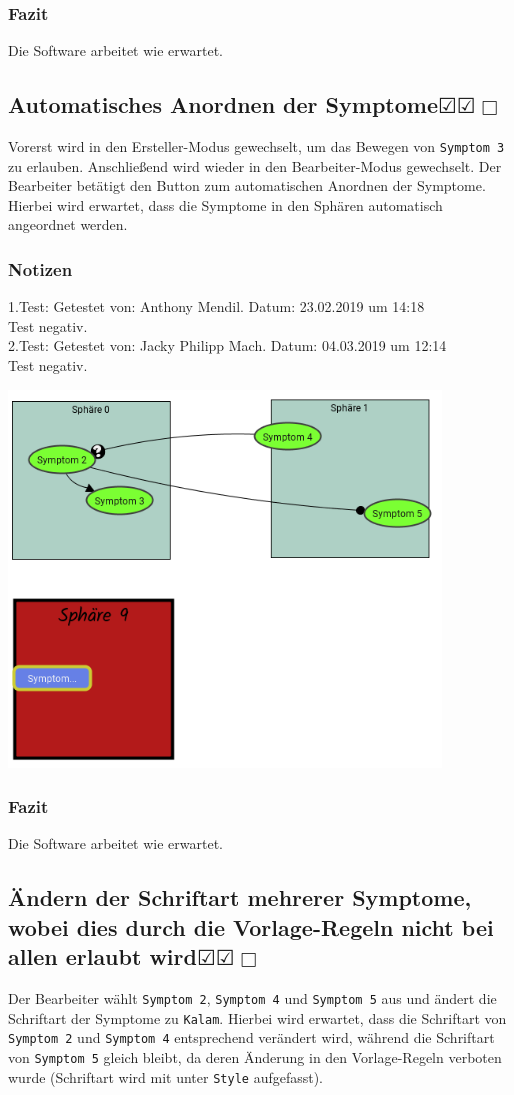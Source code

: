 \documentclass[enabledeprecatedfontcommands]{scrartcl}
\newcommand{\subsectiont}[2]{\subsection[#1]{#1{\normalsize\normalfont #2}}}
\newcommand{\leer}{$\Box$}
\newcommand{\ok}{$\CheckedBox$}
\begin{document}
\subsubsection{Fazit}
Die Software arbeitet wie erwartet.

\subsectiont{Automatisches Anordnen der Symptome}{\dotfill\ok\ok\leer}
Vorerst wird in den Ersteller-Modus gewechselt, um das Bewegen von \texttt{Symptom 3} zu erlauben. Anschließend wird wieder in den Bearbeiter-Modus gewechselt. Der Bearbeiter betätigt den Button zum automatischen Anordnen der Symptome. Hierbei wird erwartet, dass die Symptome in den Sphären automatisch angeordnet werden. 
\subsubsection{Notizen}
1.Test: Getestet von: Anthony Mendil. Datum: 23.02.2019 um 14:18 \\
Test negativ.\\
2.Test: Getestet von: Jacky Philipp Mach. Datum: 04.03.2019 um 12:14 \\
Test negativ.
\begin{center}
\includegraphics[height=10cm]{2_28.PNG}
\end{center}
\subsubsection{Fazit}
Die Software arbeitet wie erwartet.

\subsectiont{Ändern der Schriftart mehrerer Symptome, wobei dies durch die Vorlage-Regeln nicht bei allen erlaubt wird}{\dotfill\ok\ok\leer}
Der Bearbeiter wählt \texttt{Symptom 2}, \texttt{Symptom 4} und \texttt{Symptom 5} aus und ändert die Schriftart der Symptome zu \texttt{Kalam}. Hierbei wird erwartet, dass die Schriftart von  \texttt{Symptom 2} und \texttt{Symptom 4} entsprechend verändert wird, während die Schriftart von \texttt{Symptom 5} gleich bleibt, da deren Änderung in den Vorlage-Regeln verboten wurde (Schriftart wird mit unter \texttt{Style} aufgefasst).  
\end{document}

